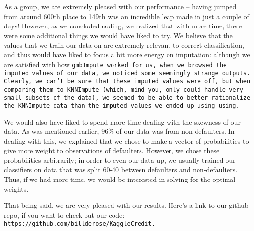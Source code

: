 \documentclass[11pt, oneside]{article}   	%
\begin{document}
		As a group, we are extremely pleased with our performance -- having jumped from around 600th place to 149th was an incredible leap made in just a couple of days! However, as we concluded coding, we realized that with more time, there were some additional things we would have liked to try. We believe that the values that we train our data on are extremely relevant to correct classification, and thus would have liked to focus a bit more energy on imputation: although we are satisfied with how \tt gmbImpute\rm~worked for us, when we browsed the imputed values of our data, we noticed some seemingly strange outputs. Clearly, we can't be sure that these imputed values were off, but when comparing them to \tt KNNImpute\rm~(which, mind you, only could handle very small subsets of the data), we seemed to be able to better rationalize the \tt KNNImpute\rm~data than the imputed values we ended up using using. 
		
		
	We would also have liked to spend more time dealing with the skewness of our data. As was mentioned earlier, 96\% of our data was from non-defaulters. In dealing with this, we explained that we chose to make a vector of probabilities to give more weight to observations of defaulters. However, we chose these probabilities arbitrarily; in order to even our data up, we usually trained our classifiers on data that was split 60-40 between defaulters and non-defaulters. Thus, if we had more time, we would be interested in solving for the optimal weights.
	
	
	That being said, we are very pleased with our results. Here's a link to our github repo, if you want to check out our code: \tt https://github.com/billderose/KaggleCredit.
\end{document}
